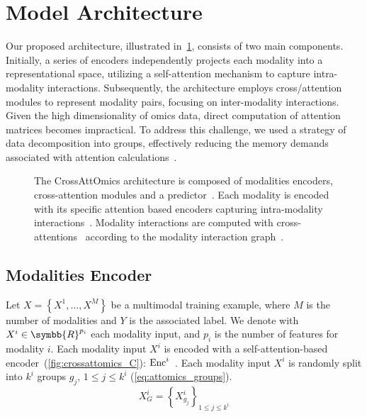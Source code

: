 \documentclass[../main.tex]{subfiles}
\begin{document}
\section{Model Architecture}
	Our proposed architecture, illustrated in~\cref{fig:crossattomics_arch}, consists of two main components.
	Initially, a series of encoders independently projects each modality into a representational space, utilizing a self-attention mechanism to capture intra-modality interactions.
	Subsequently, the architecture employs cross\-/attention modules to represent modality pairs, focusing on inter-modality interactions.
	Given the high dimensionality of omics data, direct computation of attention matrices becomes impractical.
	To address this challenge, we used a strategy of data decomposition into groups, effectively reducing the memory demands associated with attention calculations~\cite{AttOmics}.

	\begin{figure}[htbp]
		\begin{subcaptiongroup}
			\ifSubfilesClassLoaded{%
			}{
			}
			\label{fig:crossattomics_A}
			\label{fig:crossattomics_B}
			\label{fig:crossattomics_C}
			\label{fig:crossattomics_D}
		\end{subcaptiongroup}

		\caption[The CrossAttOmics architecture]{The CrossAttOmics architecture is composed of modalities encoders, cross-attention modules and a predictor~. Each modality is encoded with its specific attention based encoders capturing intra-modality interactions~. Modality interactions are computed with cross-attentions~ according to the modality interaction graph~.}\label{fig:crossattomics_arch}
	\end{figure}

	\subsection{Modalities Encoder}
		Let \( X = \left\{X^{1}, \ldots, X^{M} \right\} \) be a multimodal training example, where \(M\) is the number of modalities and \(Y\) is the associated label.
		We denote with \(X^{i} \in \symbb{R}^{p_i}\) each modality input, and \(p_i\) is the number of features for modality \(i\).
		Each modality input \(X^{i}\) is encoded with a self-attention-based encoder~(\cref{fig:crossattomics_C}): \(\operatorname{Enc}^{i}\)~\cite{AttOmics}.
		Each modality input \(X^i\) is randomly split into \(k^i\) groups \(g_j\), \(1\leq j \leq k^i\)  (\cref{eq:attomics_groups}).
		\begin{equation}
			X^{i}_{G} = {\left\{X^{i}_{g_j} \right\}}_{1\leq j\leq k^i}\label{eq:attomics_groups}
		\end{equation}
\end{document}
